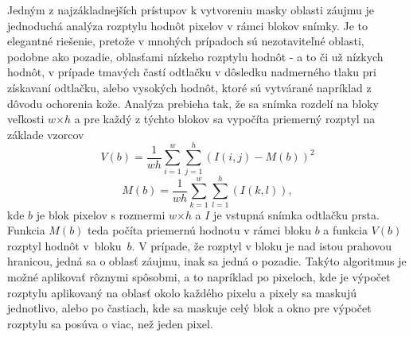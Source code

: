   Jedným z najzákladnejších prístupov k vytvoreniu masky oblasti záujmu je jednoduchá analýza rozptylu hodnôt pixelov v rámci blokov snímky. Je to elegantné
  riešenie, pretože v mnohých prípadoch sú nezotaviteľné oblasti, podobne ako pozadie, oblasťami nízkeho rozptylu hodnôt - a to či už nízkych hodnôt, v prípade
  tmavých častí odtlačku v dôsledku nadmerného tlaku pri získavaní odtlačku, alebo vysokých hodnôt, ktoré sú vytvárané napríklad z dôvodu ochorenia kože.
  Analýza prebieha tak, že sa snímka rozdelí na bloky veľkosti $w$$\times{}$$h$ a pre každý z týchto blokov sa vypočíta priemerný rozptyl na základe
  vzorcov~{\cite{babatunde2012FP_enhancement}}
  \begin{equation}
    V(b) = \frac{1}{wh} \sum_{i=1}^{w}\sum_{j=1}^{h}(I(i,j) - M(b))^2
  \end{equation}
  \begin{equation}
    M(b) = \frac{1}{wh} \sum_{k=1}^{w}\sum_{l=1}^{h}(I(k,l)),
  \end{equation}
  kde $b$ je blok pixelov s rozmermi $w$$\times{}$$h$ a $I$ je vstupná snímka odtlačku prsta. Funkcia $M(b)$ teda počíta priemernú hodnotu v rámci bloku $b$
  a funkcia $V(b)$ rozptyl hodnôt v~bloku~{$b$}. V prípade, že rozptyl v bloku je nad istou prahovou hranicou, jedná sa
  o oblasť záujmu, inak sa jedná o pozadie. Takýto algoritmus je možné aplikovať rôznymi spôsobmi, a to napríklad po pixeloch, kde je výpočet rozptylu
  aplikovaný na oblasť okolo každého pixelu a pixely sa maskujú jednotlivo, alebo po častiach, kde sa maskuje celý blok a okno pre výpočet rozptylu sa
  posúva o viac, než jeden pixel.

